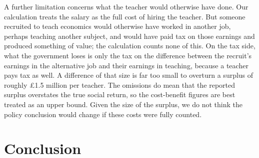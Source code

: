 A further limitation concerns what the teacher would otherwise have done. Our calculation treats the salary as the full cost of hiring the teacher. But someone recruited to teach economics would otherwise have worked in another job, perhaps teaching another subject, and would have paid tax on those earnings and produced something of value; the calculation counts none of this. On the tax side, what the government loses is only the tax on the difference between the recruit's earnings in the alternative job and their earnings in teaching, because a teacher pays tax as well. A difference of that size is far too small to overturn a surplus of roughly \pounds 1.5 million per teacher. The omissions do mean that the reported surplus overstates the true social return, so the cost-benefit figures are best treated as an upper bound. Given the size of the surplus, we do not think the policy conclusion would change if these costs were fully counted.



\section{Conclusion}
\label{sec:Conclusion}

